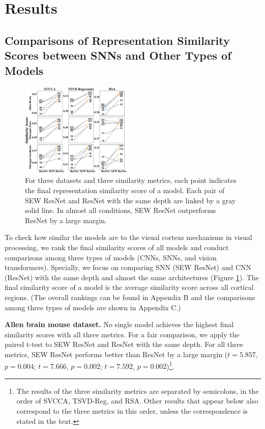 \documentclass[letterpaper]{article} %
\begin{document}
\section{Results}
\label{results}

\subsection{Comparisons of Representation Similarity Scores between SNNs and Other Types of Models}
\label{results.overall}

\begin{figure}[t]
\centering
\includegraphics[width=0.48\textwidth]{figs/resnet_compare.pdf}
\caption{For three datasets and three similarity metrics, each point indicates the final representation similarity score of a model. Each pair of SEW ResNet and ResNet with the same depth are linked by a gray solid line. In almost all conditions, SEW ResNet outperforms ResNet by a large margin.}
\label{Fig.resnet_compare}
\end{figure}

To check how similar the models are to the visual cortexs mechanisms in visual processing, we rank the final similarity scores of all models and conduct comparisons among three types of models (CNNs, SNNs, and vision transformers). Specially, we focus on comparing SNN (SEW ResNet) and CNN (ResNet) with the same depth and almost the same architectures (Figure \ref{Fig.resnet_compare}). The final similarity score of a model is the average similarity score across all cortical regions. (The overall rankings can be found in Appendix B and the comparisons among three types of models are shown in Appendix C.)

\textbf{Allen brain mouse dataset.} No single model achieves the highest final similarity scores with all three metrics. For a fair comparison, we apply the paired t-test to SEW ResNet and ResNet with the same depth. For all three metrics, SEW ResNet performs better than ResNet by a large margin ($t=5.857$, $p=0.004$; $t=7.666$, $p=0.002$; $t=7.592$, $p=0.002$)\footnote{The results of the three similarity metrics are separated by semicolons, in the order of SVCCA, TSVD-Reg, and RSA. Other results that appear below also correspond to the three metrics in this order, unless the correspondence is stated in the text.}.
\end{document}
